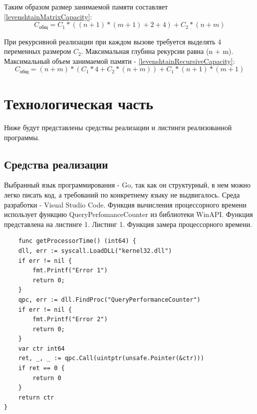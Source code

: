 \documentclass{article}
\begin{document}
	 	Таким образом размер занимаемой памяти составляет \ref{levenshtainMatrixCapacity}:
	 	\begin{equation}\label{levenshtainMatrixCapacity}
	 	C_{\text{общ}} = C_1 * ((n + 1) * (m + 1) + 2 + 4) + C_2 * (n + m)
	 	\end{equation}
	 	
	 	При рекурсивной реализации при каждом вызове требуется выделять 4 переменных размером $C_2$. Максимальная глубина рекурсии равна (n + m).
	 	Максимальный объем занимаемой памяти - \ref{levenshtainRecursiveCapacity}:
	 	\begin{equation}\label{levenshtainRecursiveCapacity}
	 	C_{\text{общ}} = (n + m) * (C_1 * 4 + C_2 * (n + m)) + C_1 * (n + 1) * (m + 1)
	 	\end{equation}
	\newpage
	\section{Технологическая часть}
	Ниже будут представлены средствы реализации и листинги реализованной программы.
	\subsection{Средcтва реализации}
	Выбранный язык программирования - Go, так как он структурный, в нем можно легко писать код, а требований по конкретнему языку не выдвигалось.\cite{vs-code} Среда разработки - Visual Studio Code.\cite{golang}
	\newline
	\indent Функция вычисления процессорного времени использует функцию QueryPerfomanceCounter из библиотеки WinAPI.\cite{winapi} Функция представлена на листинге 1.
	\newline
	\indent Листинг 1. Функция замера процессорного времени.
	\begin{lstlisting}
	func getProcessorTime() (int64) {
	dll, err := syscall.LoadDLL("kernel32.dll")
	if err != nil {
		fmt.Printf("Error 1")
		return 0;
	}
	qpc, err := dll.FindProc("QueryPerformanceCounter")
	if err != nil {
		fmt.Printf("Error 2")
		return 0;
	}
	var ctr int64
	ret, _, _ := qpc.Call(uintptr(unsafe.Pointer(&ctr)))
	if ret == 0 {
		return 0
	}
	return ctr
}
	\end{lstlisting}
\end{document}
